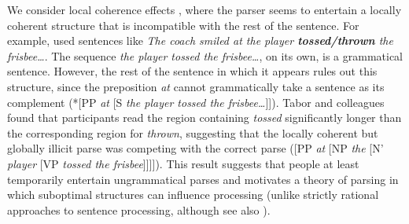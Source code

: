 \documentclass[10pt,letterpaper]{article}
\begin{document}
We consider local coherence effects \cite{tabor2004effects, konieczny2005psychological, paape2015local}, where the parser seems to entertain a locally coherent structure that is incompatible with the rest of the sentence. For example,  used sentences like \emph{The coach smiled at the player \textbf{tossed/thrown} the frisbee\dots}. The sequence \emph{the player tossed the frisbee\dots}, on its own, is a grammatical sentence. However, the rest of the sentence in which it appears rules out this structure, since the preposition \emph{at} cannot grammatically take a sentence as its complement (*[PP \emph{at} [S \emph{the player tossed the frisbee\dots}]]). Tabor and colleagues found that participants read the region containing \emph{tossed} significantly longer than the corresponding region for \emph{thrown}, suggesting that the locally coherent but globally illicit parse was competing with the correct parse ([PP \emph{at} [NP \emph{the} [N' \emph{player} [VP \emph{tossed the frisbee}]]]]). This result suggests that people at least temporarily entertain ungrammatical parses and motivates a theory of parsing in which suboptimal structures can influence processing (unlike strictly rational approaches to sentence processing, although see also ).

\end{document}
